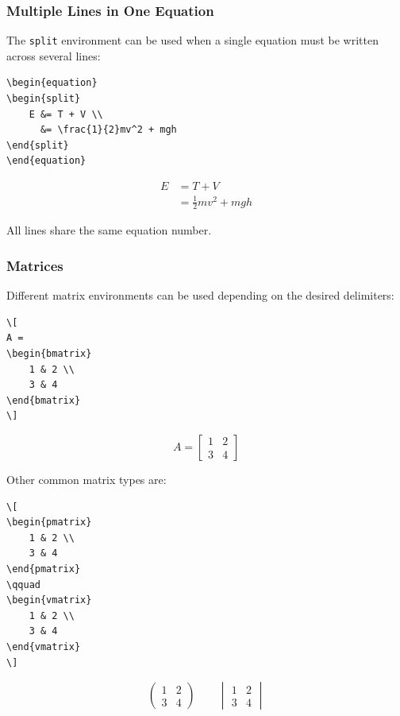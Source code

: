\subsubsection{Multiple Lines in One Equation}

The \texttt{split} environment can be used when a single equation
must be written across several lines:

\begin{lstlisting}[style=latex]
\begin{equation}
\begin{split}
    E &= T + V \\
      &= \frac{1}{2}mv^2 + mgh
\end{split}
\end{equation}
\end{lstlisting}

\begin{equation}
\begin{split}
    E &= T + V \\
      &= \frac{1}{2}mv^2 + mgh
\end{split}
\end{equation}

All lines share the same equation number.


\subsubsection{Matrices}

Different matrix environments can be used depending on the desired
delimiters:

\begin{lstlisting}[style=latex]
\[
A =
\begin{bmatrix}
    1 & 2 \\
    3 & 4
\end{bmatrix}
\]
\end{lstlisting}

\[
A =
\begin{bmatrix}
    1 & 2 \\
    3 & 4
\end{bmatrix}
\]

Other common matrix types are:

\begin{lstlisting}[style=latex]
\[
\begin{pmatrix}
    1 & 2 \\
    3 & 4
\end{pmatrix}
\qquad
\begin{vmatrix}
    1 & 2 \\
    3 & 4
\end{vmatrix}
\]
\end{lstlisting}

\[
\begin{pmatrix}
    1 & 2 \\
    3 & 4
\end{pmatrix}
\qquad
\begin{vmatrix}
    1 & 2 \\
    3 & 4
\end{vmatrix}
\]